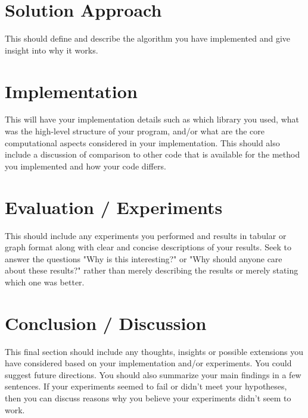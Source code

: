 \documentclass{article}
\begin{document}
\section{Solution Approach}
This should define and describe the algorithm you have implemented and give insight into why it works.

\section{Implementation}
This will have your implementation details such as which library you used, what was the high-level structure of your program, and/or what are the core computational aspects considered in your implementation.  This should also include a discussion of comparison to other code that is available for the method you implemented and how your code differs.

\section{Evaluation / Experiments}
This should include any experiments you performed and results in tabular or graph format along with clear and concise descriptions of your results.  Seek to answer the questions "Why is this interesting?" or "Why should anyone care about these results?" rather than merely describing the results or merely stating which one was better.

\section{Conclusion / Discussion}
This final section should include any thoughts, insights or possible extensions you have considered based on your implementation and/or experiments.  You could suggest future directions.  You should also summarize your main findings in a few sentences.  If your experiments seemed to fail or didn't meet your hypotheses, then you can discuss reasons why you believe your experiments didn't seem to work.



\end{document}
